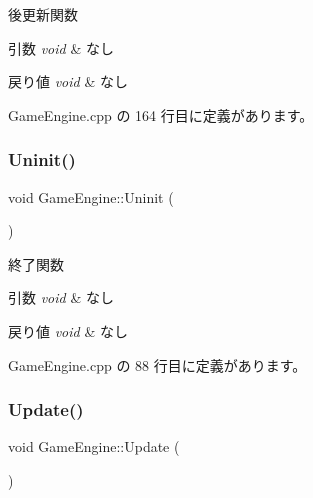 後更新関数 


\begin{DoxyParams}{引数}
{\em void} & なし \\
\hline
\end{DoxyParams}

\begin{DoxyRetVals}{戻り値}
{\em void} & なし \\
\hline
\end{DoxyRetVals}


 Game\+Engine.\+cpp の 164 行目に定義があります。

\mbox{\label{class_game_engine_aa89b63164382b8a5e34dc985a876be11}} 
\subsubsection{\texorpdfstring{Uninit()}{Uninit()}}
{\footnotesize\ttfamily void Game\+Engine\+::\+Uninit (\begin{DoxyParamCaption}{ }\end{DoxyParamCaption})}



終了関数 


\begin{DoxyParams}{引数}
{\em void} & なし \\
\hline
\end{DoxyParams}

\begin{DoxyRetVals}{戻り値}
{\em void} & なし \\
\hline
\end{DoxyRetVals}


 Game\+Engine.\+cpp の 88 行目に定義があります。

\mbox{\label{class_game_engine_ae831b6dee7c10ddc3cf5bc5d217031b1}} 
\subsubsection{\texorpdfstring{Update()}{Update()}}
{\footnotesize\ttfamily void Game\+Engine\+::\+Update (\begin{DoxyParamCaption}{ }\end{DoxyParamCaption})}



